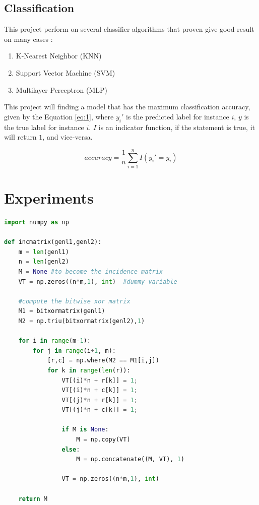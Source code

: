 \documentclass[a4paper,oneside]{article}
\begin{document}
\subsection{Classification}

This project perform on several classifier algorithms that proven give good result on many cases \cite{three} :
\begin{enumerate}
\item K-Nearest Neighbor (KNN)
\item Support Vector Machine (SVM)
\item Multilayer Perceptron (MLP)
\end{enumerate}

This project will finding a model that has the maximum classification accuracy, given by the Equation \ref{eq:1}, where $y_{i}'$ is the predicted label for instance $i$, $y$ is the true label for instance $i$. $I$ is an indicator function, if the statement is true, it will return $1$, and vice-versa.

\begin{equation} \label{eq:1}
accuracy =  \frac{1}{n}  \sum_{i=1}^n  I(y_{i}' = y_{i})
\end{equation}

\section{Experiments}
\begin{lstlisting}[language=Python]
import numpy as np
 
def incmatrix(genl1,genl2):
    m = len(genl1)
    n = len(genl2)
    M = None #to become the incidence matrix
    VT = np.zeros((n*m,1), int)  #dummy variable
 
    #compute the bitwise xor matrix
    M1 = bitxormatrix(genl1)
    M2 = np.triu(bitxormatrix(genl2),1) 
 
    for i in range(m-1):
        for j in range(i+1, m):
            [r,c] = np.where(M2 == M1[i,j])
            for k in range(len(r)):
                VT[(i)*n + r[k]] = 1;
                VT[(i)*n + c[k]] = 1;
                VT[(j)*n + r[k]] = 1;
                VT[(j)*n + c[k]] = 1;
 
                if M is None:
                    M = np.copy(VT)
                else:
                    M = np.concatenate((M, VT), 1)
 
                VT = np.zeros((n*m,1), int)
 
    return M
\end{lstlisting}
\end{document}
